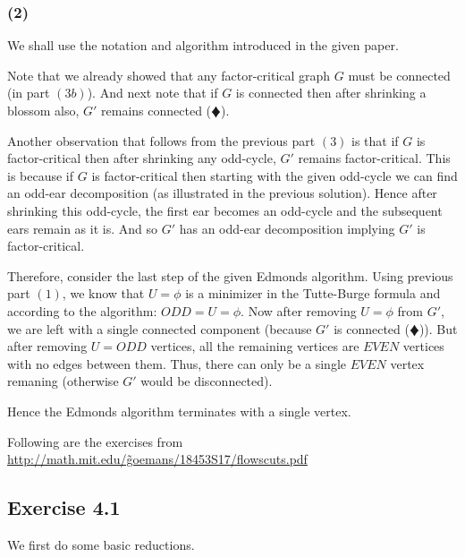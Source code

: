 \documentclass[12pt]{article}
\begin{document}
\subsubsection*{(2)}

We shall use the notation and algorithm introduced in the given paper.

Note that we already showed that any factor-critical graph $G$ must be connected (in part $(3b)$). And next note that if $G$ is connected then after shrinking a blossom also, $G'$ remains connected ($\vardiamondsuit$).

Another observation that follows from the previous part $(3)$ is that if $G$ is factor-critical then after shrinking any odd-cycle, $G'$ remains factor-critical. This is because if $G$ is factor-critical then starting with the given odd-cycle we can find an odd-ear decomposition (as illustrated in the previous solution). Hence after shrinking this odd-cycle, the first ear becomes an odd-cycle and the subsequent ears remain as it is. And so $G'$ has an odd-ear decomposition implying $G'$ is factor-critical.

Therefore, consider the last step of the given Edmonds algorithm. Using previous part $(1)$, we know that $U=\phi$ is a minimizer in the Tutte-Burge formula and according to the algorithm: $ODD=U=\phi$. Now after removing $U=\phi$ from $G'$, we are left with a single connected component (because $G'$ is connected ($\vardiamondsuit$)). But after removing $U=ODD$ vertices, all the remaining vertices are $EVEN$ vertices with no edges between them. Thus, there can only be a single $EVEN$ vertex remaning (otherwise $G'$ would be disconnected).

Hence the Edmonds algorithm terminates with a single vertex.
\newline

Following are the exercises from \href{http://math.mit.edu/\~goemans/18453S17/flowscuts.pdf}{http://math.mit.edu/\~goemans/18453S17/flowscuts.pdf}

\subsection*{Exercise 4.1}

We first do some basic reductions.
\end{document}
